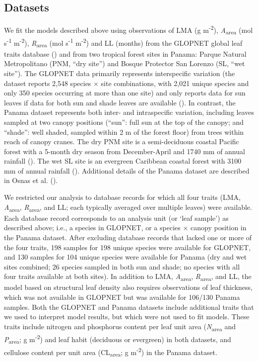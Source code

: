 \documentclass[
  12pt,
  letterpaper,
  DIV=11,
  numbers=noendperiod]{scrartcl}
\begin{document}
\subsection{Datasets}\label{datasets}

We fit the models described above using observations of LMA (g
m\textsuperscript{-2}), \emph{A}\textsubscript{area} (mol
s\textsuperscript{-1} m\textsuperscript{-2}),
\emph{R}\textsubscript{area} (mol s\textsuperscript{-1}
m\textsuperscript{-2}) and LL (months) from the GLOPNET global leaf
traits database () and
from two tropical forest sites in Panama: Parque Natural Metropolitano
(PNM, ``dry site'') and Bosque Protector San Lorenzo (SL, ``wet site'').
The GLOPNET data primarily represents interspecific variation (the
dataset reports 2,548 species \(\times\) site combinations, with 2,021
unique species and only 350 species occurring at more than one site) and
only reports data for sun leaves if data for both sun and shade leaves
are available (). In
contrast, the Panama dataset represents both inter- and intraspecific
variation, including leaves sampled at two canopy positions (``sun'':
full sun at the top of the canopy; and ``shade'': well shaded, sampled
within 2 m of the forest floor) from trees within reach of canopy
cranes. The dry PNM site is a semi-deciduous coastal Pacific forest with
a 5-month dry season from December-April and 1740 mm of annual rainfall
(). The wet SL site is an
evergreen Caribbean coastal forest with 3100 mm of annual rainfall
(). Additional details of
the Panama dataset are described in Osnas et al.
().

We restricted our analysis to database records for which all four traits
(LMA, \emph{A}\textsubscript{area}, \emph{R}\textsubscript{area}, and
LL; each typically averaged over multiple leaves) were available. Each
database record corresponds to an analysis unit (or `leaf sample') as
described above; i.e., a species in GLOPNET, or a species \(\times\)
canopy position in the Panama dataset. After excluding database records
that lacked one or more of the four traits, 198 samples for 198 unique
species were available for GLOPNET, and 130 samples for 104 unique
species were available for Panama (dry and wet sites combined; 26
species sampled in both sun and shade; no species with all four traits
available at both sites). In addition to LMA,
\emph{A}\textsubscript{area}, \emph{R}\textsubscript{area}, and LL, the
model based on structural leaf density also requires observations of
leaf thickness, which was not available in GLOPNET but was available for
106/130 Panama samples. Both the GLOPNET and Panama datasets include
additional traits that we used to interpret model results, but which
were not used to fit models. These traits include nitrogen and
phosphorus content per leaf unit area (\emph{N}\textsubscript{area} and
\emph{P}\textsubscript{area}; g m\textsuperscript{-2}) and leaf habit
(deciduous or evergreen) in both datasets, and cellulose content per
unit area (CL\textsubscript{area}; g m\textsuperscript{-2}) in the
Panama dataset.
\end{document}
